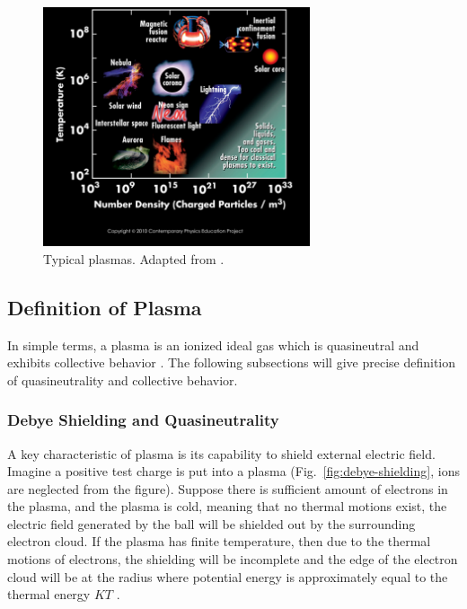 \begin{figure}[htbp]
	\centering
	\includegraphics[width=0.7\textwidth]{figures/plasma-properties}
	\caption{Typical plasmas. Adapted from \cite{cpep_physics}.}
	\label{fig:plasma-properties}
\end{figure}

\subsection{Definition of Plasma}
In simple terms, a plasma is an ionized ideal gas which is quasineutral and exhibits collective behavior \cite{chen_introduction_2016}. The following subsections will give precise definition of quasineutrality and collective behavior.

\subsubsection*{Debye Shielding and Quasineutrality}
A key characteristic of plasma is its capability to shield external electric field. Imagine a positive test charge is put into a plasma (Fig.~\ref{fig:debye-shielding}, ions are neglected from the figure). Suppose there is sufficient amount of electrons in the plasma, and the plasma is cold, meaning that no thermal motions exist, the electric field generated by the ball will be shielded out by the surrounding electron cloud. If the plasma has finite temperature, then due to the thermal motions of electrons, the shielding will be incomplete and the edge of the electron cloud will be at the radius where potential energy is approximately equal to the thermal energy $KT$ \cite{chen_introduction_2016}.

